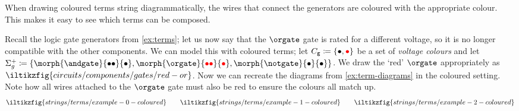 When drawing coloured terms string diagrammatically, the wires that connect the
generators are coloured with the appropriate colour.
This makes it easy to see which terms can be composed.

\begin{example}
    Recall the logic gate generators from \cref{ex:terms}; let us now say that
    the \(\orgate\) gate is rated for a different voltage, so it is no longer
    compatible with the other components.
    We can model this with coloured terms; let
    \(C_\mathsf{g} \coloneqq \{\bullet,\textcolor{red}{\bullet}\}\) be a set of
    \emph{voltage colours} and let \(
    \Sigma_g^+
    \coloneqq
    \{\morph{\andgate}{\bullet\bullet}{\bullet}, \morph{\orgate}{\redbullet\redbullet}{\redbullet}, \morph{\notgate}{\bullet}{\bullet}\}
    \).
    We draw the `red' \(\orgate\) appropriately as \(
    \iltikzfig{circuits/components/gates/red-or}
    \).
    Now we can recreate the diagrams from \cref{ex:term-diagrams} in the
    coloured setting.
    Note how all wires attached to the \(\orgate\) gate must also be red
    to ensure the colours all match up.
    \begin{gather*}
        \iltikzfig{strings/terms/example-0-coloured}
        \qquad
        \iltikzfig{strings/terms/example-1-coloured}
        \qquad
        \iltikzfig{strings/terms/example-2-coloured}
    \end{gather*}
\end{example}
